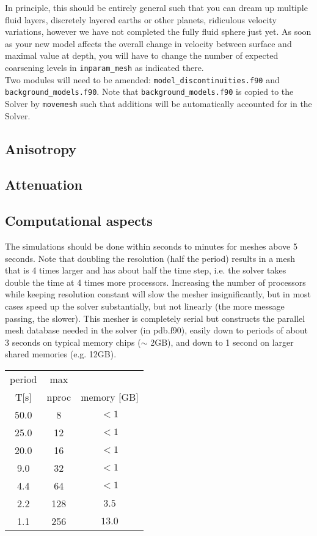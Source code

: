 \documentclass[11pt,letter,fleqn,english,notitlepage]{article}
\begin{document}
\noindent In principle, this should be entirely general such that you can dream up multiple fluid layers,
discretely layered earths or other planets, ridiculous velocity variations, 
however we have not completed the fully fluid sphere just yet. As soon as your new 
model affects the overall change in velocity between surface and maximal value at depth, you 
will have to change the number of expected coarsening levels in {\tt inparam\_mesh} as indicated there.\\

\noindent Two modules will need to be amended: {\tt model\_discontinuities.f90} and {\tt background\_models.f90}.
Note that {\tt background\_models.f90} is copied to the Solver by {\tt movemesh} 
such that additions will be automatically accounted for in the Solver. 

\subsection{Anisotropy}

\subsection{Attenuation}

\subsection{Computational aspects}
The simulations should be done within seconds to minutes for meshes above 5 seconds.
Note that doubling the resolution (half the period) results in a mesh that 
is 4 times larger and has about half the time step, i.e. the solver takes 
double the time at 4 times more processors. Increasing the number of 
processors while keeping resolution constant will slow the mesher insignificantly, 
but in most cases speed up the solver substantially, but not linearly
(the more message passing, the slower).
This mesher is completely serial but constructs the parallel mesh database 
needed in the solver (in pdb.f90), easily down to periods of about 
3 seconds on typical memory chips ($\sim$ 2GB), and down to 1 second on 
larger shared memories (e.g. 12GB).

\begin{table}[h]
\begin{tabular}{ccc}
period & max  \\
 T[s]  & nproc & memory [GB] \\
\hline
 50.0 &    8  &  $< 1$  \\
 25.0 &   12  &  $< 1$  \\
 20.0 &   16  &  $< 1$  \\
  9.0 &   32  &  $< 1$  \\
  4.4 &   64  &  $< 1$  \\
  2.2 &  128  &  $ 3.5 $ \\
  1.1 &  256  &  $13.0 $ \\
\end{tabular}
\end{table}
\end{document}
